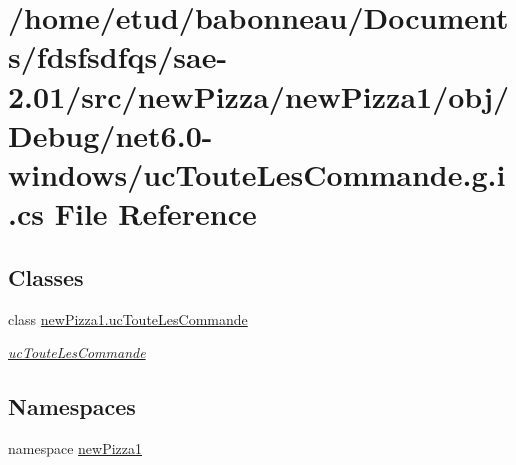 \hypertarget{net6_80-windows_2ucTouteLesCommande_8g_8i_8cs}{}\section{/home/etud/babonneau/\+Documents/fdsfsdfqs/sae-\/2.01/src/new\+Pizza/new\+Pizza1/obj/\+Debug/net6.0-\/windows/uc\+Toute\+Les\+Commande.g.\+i.\+cs File Reference}
\label{net6_80-windows_2ucTouteLesCommande_8g_8i_8cs}
\subsection*{Classes}
\begin{DoxyCompactItemize}
\item 
class \hyperlink{classnewPizza1_1_1ucTouteLesCommande}{new\+Pizza1.\+uc\+Toute\+Les\+Commande}
\begin{DoxyCompactList}\small\item\em \hyperlink{classnewPizza1_1_1ucTouteLesCommande}{uc\+Toute\+Les\+Commande} \end{DoxyCompactList}\end{DoxyCompactItemize}
\subsection*{Namespaces}
\begin{DoxyCompactItemize}
\item 
namespace \hyperlink{namespacenewPizza1}{new\+Pizza1}
\end{DoxyCompactItemize}
